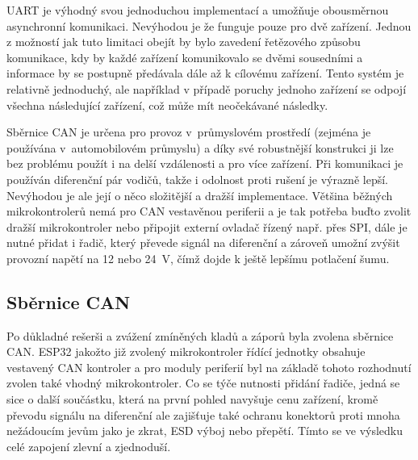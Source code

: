         UART je výhodný svou jednoduchou implementací a umožňuje obousměrnou asynchronní komunikaci. Nevýhodou je že funguje pouze pro dvě zařízení. Jednou z možností jak tuto limitaci obejít by bylo zavedení řetězového způsobu komunikace, kdy by každé zařízení komunikovalo se dvěmi sousedními a informace by se postupně předávala dále až k cílovému zařízení. Tento systém je relativně jednoduchý, ale například v případě poruchy jednoho zařízení se odpojí všechna následující zařízení, což může mít neočekávané následky.

        Sběrnice CAN je určena pro provoz v~průmyslovém prostředí (zejména je používána v~automobilovém průmyslu) a díky své robustnější konstrukci ji lze bez problému použít i na delší vzdálenosti a pro více zařízení. Při komunikaci je používán diferenční pár vodičů, takže i odolnost proti rušení je výrazně lepší. Nevýhodou je ale její o něco složitější a dražší implementace. Většina běžných mikrokontrolerů nemá pro CAN vestavěnou periferii a je tak potřeba buďto zvolit dražší mikrokontroler nebo připojit externí ovladač řízený např. přes SPI, dále je nutné přidat i řadič, který převede signál na diferenční a zároveň umožní zvýšit provozní napětí na 12  nebo \qty{24}{V}, čímž dojde k ještě lepšímu potlačení šumu.

    \subsection{Sběrnice CAN}
        Po důkladné rešerši a zvážení zmíněných kladů a záporů byla  zvolena sběrnice CAN. ESP32 jakožto již zvolený mikrokontroler řídící jednotky obsahuje vestavený CAN kontroler a pro moduly periferií byl na základě tohoto rozhodnutí zvolen také vhodný mikrokontroler. Co se týče nutnosti přidání řadiče, jedná se sice o další součástku, která na první pohled navyšuje cenu zařízení, kromě převodu signálu na diferenční ale zajišťuje také ochranu konektorů proti mnoha nežádoucím jevům jako je zkrat, ESD výboj nebo přepětí. Tímto se ve výsledku celé zapojení zlevní a zjednoduší.


   
